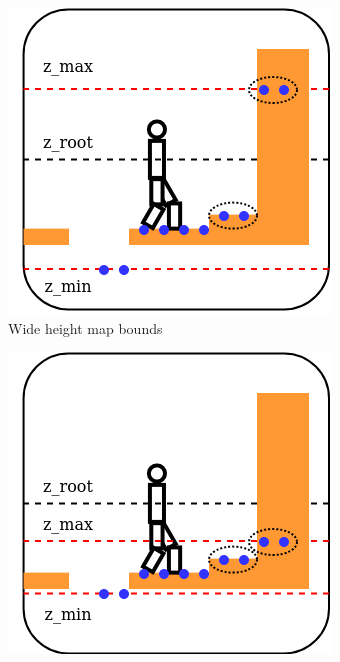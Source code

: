 \begin{figure}
    \captionsetup[subfigure]{justification=centering}
    \begin{subfigure}[t]{.49\linewidth}
    \includegraphics[width=\textwidth]{Figures/Chapter_LEAS/hm_bounded_high.png}
    \caption{Wide height map bounds}
    \end{subfigure}
    \begin{subfigure}[t]{.49\linewidth}
    \includegraphics[width=\textwidth]{Figures/Chapter_LEAS/hm_bounded_low.png}

\end{subfigure}
\end{figure}

